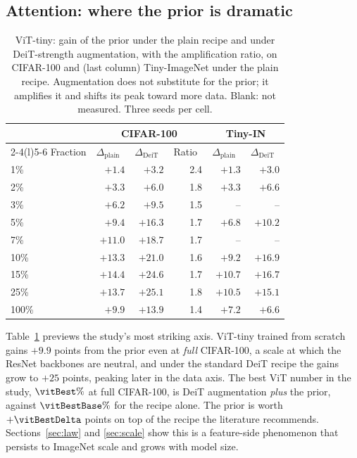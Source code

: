 \subsection{Attention: where the prior is dramatic}\label{sec:attention}
\begin{table}[pos=htbp]
\caption{ViT-tiny: gain of the prior under the plain recipe and under
DeiT-strength augmentation, with the amplification ratio, on CIFAR-100
and (last column) Tiny-ImageNet under the plain recipe. Augmentation does
not substitute for the prior; it amplifies it and shifts its peak toward
more data. Blank: not measured. Three seeds per cell.}
\label{tab:vitenvelope}
\centering\scriptsize
\setlength{\tabcolsep}{1.9pt}
\begin{tabular}{lrrrrr}
\toprule
 & \multicolumn{3}{c}{CIFAR-100} & \multicolumn{2}{c}{Tiny-IN} \\
\cmidrule(lr){2-4}\cmidrule(l){5-6}
Fraction & $\Delta_{\mathrm{plain}}$~\up & $\Delta_{\mathrm{DeiT}}$~\up & Ratio~\up & $\Delta_{\mathrm{plain}}$~\up & $\Delta_{\mathrm{DeiT}}$~\up \\
\midrule
1\%   & $+1.4$  & $+3.2$            & 2.4 & $+1.3$ & $+3.0$ \\
2\%   & $+3.3$  & $+6.0$            & 1.8 & $+3.3$ & $+6.6$ \\
3\%   & $+6.2$  & $+9.5$            & 1.5 & -- & -- \\
5\%   & $+9.4$  & $+16.3$           & 1.7 & $+6.8$ & $+10.2$ \\
7\%   & $+11.0$ & $+18.7$           & 1.7 & -- & -- \\
10\%  & $+13.3$ & $+21.0$           & 1.6 & $+9.2$ & $\mathbf{+16.9}$ \\
15\%  & $\mathbf{+14.4}$ & $+24.6$  & 1.7 & $\mathbf{+10.7}$ & $+16.7$ \\
25\%  & $+13.7$ & $\mathbf{+25.1}$  & 1.8 & $+10.5$ & $+15.1$ \\
100\% & $+9.9$  & $+13.9$           & 1.4 & $+7.2$ & $+6.6$ \\
\bottomrule
\end{tabular}
\end{table}

Table~\ref{tab:vitenvelope} previews the study's most striking axis.
ViT-tiny trained from scratch gains $+9.9$ points from the prior even at
\emph{full} CIFAR-100, a scale at which the ResNet backbones are
neutral, and under the standard DeiT recipe the gains grow to
$+25$ points, peaking later in the data axis. The best ViT number in the
study, $\vitBest\%$ at full CIFAR-100, is DeiT augmentation \emph{plus} the
prior, against $\vitBestBase\%$ for the recipe alone. The prior is worth
$+\vitBestDelta$ points on top of the recipe the literature recommends. Sections~\ref{sec:law} and
\ref{sec:scale} show this is a feature-side phenomenon that persists to
ImageNet scale and grows with model size.
